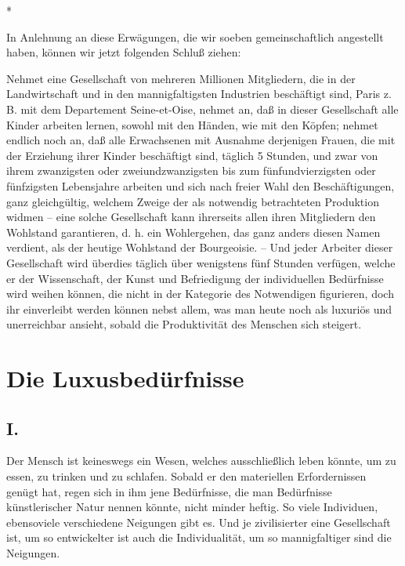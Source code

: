 \documentclass{scrbook}
\begin{document}
\begin{center}*\end{center}

In Anlehnung an diese Erwägungen, die wir soeben gemeinschaftlich angestellt haben, können wir jetzt folgenden Schluß ziehen:

Nehmet eine Gesellschaft von mehreren Millionen Mitgliedern, die in der Landwirtschaft und in den mannigfaltigsten Industrien beschäftigt sind, Paris z. B. mit dem Departement Seine-et-Oise, nehmet an, daß in dieser Gesellschaft alle Kinder arbeiten lernen, sowohl mit den Händen, wie mit den Köpfen; nehmet endlich noch an, daß alle Erwachsenen mit Ausnahme derjenigen Frauen, die mit der Erziehung ihrer Kinder beschäftigt sind, täglich 5 Stunden, und zwar von ihrem zwanzigsten oder zweiundzwanzigsten bis zum fünfundvierzigsten oder fünfzigsten Lebensjahre arbeiten und sich nach freier Wahl den Beschäftigungen, ganz gleichgültig, welchem Zweige der als notwendig betrachteten Produktion widmen – eine solche Gesellschaft kann ihrerseits allen ihren Mitgliedern den Wohlstand garantieren, d. h. ein Wohlergehen, das ganz anders diesen Namen verdient, als der heutige Wohlstand der Bourgeoisie. – Und jeder Arbeiter dieser Gesellschaft wird überdies täglich über wenigstens fünf Stunden verfügen, welche er der Wissenschaft, der Kunst und Befriedigung der individuellen Bedürfnisse wird weihen können, die nicht in der Kategorie des Notwendigen figurieren, doch ihr einverleibt werden können nebst allem, was man heute noch als luxuriös und unerreichbar ansieht, sobald die Produktivität des Menschen sich steigert.

\chapter{Die Luxusbedürfnisse}
\section*{I.}

Der Mensch ist keineswegs ein Wesen, welches ausschließlich leben könnte, um zu essen, zu trinken und zu schlafen. Sobald er den materiellen Erfordernissen genügt hat, regen sich in ihm jene Bedürfnisse, die man Bedürfnisse künstlerischer Natur nennen könnte, nicht minder heftig. So viele Individuen, ebensoviele verschiedene Neigungen gibt es. Und je zivilisierter eine Gesellschaft ist, um so entwickelter ist auch die Individualität, um so mannigfaltiger sind die Neigungen.
\end{document}
